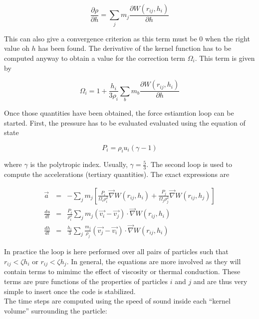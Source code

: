 \documentclass[a4paper,10pt]{article}
\begin{document}
\begin{equation}
 \frac{\partial \rho}{\partial h} = \sum_j m_j \frac{\partial W(r_{ij},h_i)}{\partial h}
\end{equation}

This can also give a convergence criterion as this term must be $0$ when the right value oh $h$ has been found.
The derivative of the kernel function has to be computed anyway to obtain a value for the correction term $\Omega_i$.
This term is given by

\begin{equation}
  \Omega_i = 1 + \frac{h_i}{3\rho_i}\sum_b m_b\frac{\partial W(r_{ij},h_i)}{\partial h}
\end{equation}

Once those quantities have been obtained, the force estiamtion loop can be started.
First, the pressure has to be evaluated evaluated using the equation of state

\begin{equation}
 P_i = \rho_i u_i (\gamma - 1)
\end{equation}

where $\gamma$ is the polytropic index. Usually, $\gamma = \frac{5}{3}$.
The second loop is used to compute the accelerations (tertiary quantities). The exact expressions are

\begin{eqnarray}
 \vec{a} &=& - \sum_j m_j\left[\frac{P_i}{\Omega_i\rho_i^2}\vec{\nabla} W(r_{ij}, h_i) +
\frac{P_j}{\Omega_j\rho_j^2}\vec{\nabla}
W(r_{ij}, h_j) \right] \\
 \frac{du}{dt} &=& \frac{P_i}{\rho_i^2} \sum_j m_j (\vec{v_i}-\vec{v_j})\cdot\vec{\nabla} W(r_{ij}, h_i) \\
 \frac{dh}{dt} &=& \frac{h_i}{3}\sum_j \frac{m_j}{\rho_j} \left(\vec{v_j} - \vec{v_i} \right) \cdot\vec{\nabla}W(r_{ij},
h_i)
\end{eqnarray}

In practice the loop is here performed over all pairs of particles such that $r_{ij} < \zeta h_i$ or $r_{ij} < \zeta
h_j$. In general, the equations are more involved as they will contain terms to mimimc the effect of viscosity or
thermal conduction. These terms are pure functions of the properties of particles $i$ and $j$ and are thus very simple
to insert once the code is stabilized.\\

The time steps are computed using the speed of sound inside each ``kernel volume'' surrounding the particle:
\end{document}
